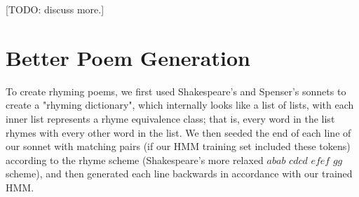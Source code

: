 [TODO: discuss more.]


\section{Better Poem Generation}
\par To create rhyming poems, we first used Shakespeare's and Spenser's sonnets to create a "rhyming dictionary", which internally looks like a list of lists, with each inner list represents a rhyme equivalence class; that is, every word in the list rhymes with every other word in the list. We then seeded the end of each line of our sonnet with matching pairs (if our HMM training set included these tokens) according to the rhyme scheme (Shakespeare's more relaxed $abab$ $cdcd$ $efef$ $gg$ scheme), and then generated each line backwards in accordance with our trained HMM.

